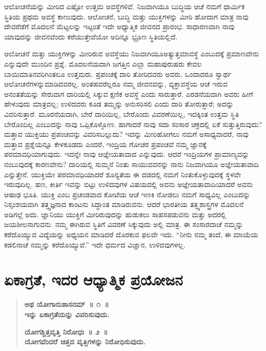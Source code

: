 \vskip 0.3cm

ಆಲೋಚನೆಯನ್ನು ಮೀರಿದ ಎಷ್ಟೋ ಉತ್ತಮ ಅವಸ್ಥೆಗಳಿವೆ. ನಿಜವಾಗಿಯೂ ಬುದ್ಧಿಯ ಆಚೆ ನಮಗೆ ಧಾರ್ಮಿಕ ಸ್ಥಿತಿಯ ಪ್ರಥಮ ಅವಸ್ಥೆ ಕಾಣುವುದು. ಆಲೋಚನೆ, ಬುದ್ಧಿ ಮತ್ತು ಯುಕ್ತಿಗಳನ್ನು ಮೀರಿ ಹೋದಾಗ ಮಾತ್ರ ನಾವು ದೇವರೆಡೆಗೆ ಮೊದಲನೆ ಮೆಟ್ಟಲನ್ನು ಇಟ್ಟಂತೆ ಇದೇ ಅಧ್ಯಾತ್ಮಿಕ ಜೀವನದ ಪ್ರಾರಂಭ. ಸಾಧಾರಣವಾಗಿ ನಾವು ಯಾವುದನ್ನು ಜೀವನವೆಂದು ಕರೆಯುತ್ತೇವೆಯೋ ಅದಿನ್ನೂ ಭ್ರೂಣ ಸ್ಥಿತಿಯಲ್ಲಿದೆ. 

\vskip 0.3cm

ಆಲೋಚನೆ ಮತ್ತು ಯುಕ್ತಿಗಳನ್ನು ಮೀರಿರುವ ಅವಸ್ಥೆಯು ನಿಜವಾಗಿಯೂ\break ಅತ್ಯುತ್ತಮಾವಸ್ಥೆ ಎಂಬುದಕ್ಕೆ ಪ್ರಮಾಣವೇನು ಎನ್ನುವುದೇ ಮುಂದಿನ ಪ್ರಶ್ನೆ. ಮೊದಲನೆಯದಾಗಿ ಜಗತ್ತಿನ ಎಲ್ಲಾ ಮಹಾಪುರುಷರು ಕೇವಲ ಬಾಯಿಮಾತಿನವರಿಗಿಂತಲೂ ಉತ್ತಮರು. ಪ್ರಪಂಚಕ್ಕೆ ದಾರಿ ತೋರಿದವರು ಅವರು. ಒಂದಾದರೂ ಸ್ವಾರ್ಥ ಆಲೋಚನೆಗಳನ್ನು\break ಮಾಡಿದವರಲ್ಲ. ಅಂತಹವರೆಲ್ಲರೂ ನಮ್ಮ ಜೀವನವನ್ನು, ವ್ಯಕ್ತಾವಸ್ಥೆಯ ಆಚೆ ಇರುವ ಅನಂತತೆಯನ್ನು ಸೇರುವಾಗ ದಾರಿಯಲ್ಲಿ ಸಿಕ್ಕುವ ಕ್ಷಣಿಕ ಅವಸ್ಥೆ ಎಂದು ಸಾರುತ್ತಾರೆ. ಎರಡನೆಯದಾಗಿ ಅವರು ಹೀಗೆ ಹೇಳುವುದು ಮಾತ್ರವಲ್ಲ; ಉಳಿದವರು ಕೂಡ ತಮ್ಮನ್ನು ಅನುಸರಿಸಲಿ ಎಂದು ದಾರಿ ತೋರುತ್ತಾರೆ; ಅದನ್ನು ವಿವರಿಸುತ್ತಾರೆ. ಮೂರನೆಯದಾಗಿ, ಬೇರೆ ದಾರಿಯಿಲ್ಲ, ಬೇರೊಂದು ವಿವರಣೆಯಿಲ್ಲ, ಇದಕ್ಕಿಂತ ಉತ್ತಮ ಸ್ಥಿತಿ ಬೇರೊಂದಿಲ್ಲ ಎಂಬುದನ್ನು ನಾವು ಒಪ್ಪಿಕೊಳ್ಳೋಣ. ಹಾಗಾದರೆ ನಾವು ಸದಾ ಸಂಸಾರ ಚಕ್ರದಲ್ಲಿ ಏಕೆ ಸುತ್ತುತ್ತಿರುವುದು? ಮತ್ತಾವ ಯುಕ್ತಿಯು ಪ್ರಪಂಚವನ್ನು ವಿವರಿಸಬಲ್ಲುದು? ಇದನ್ನು ಮೀರಿಹೋಗಲು ನಮಗೆ ಅಸಾಧ್ಯವಾದರೆ, ನಾವು ಮತ್ತಾವ ಪ್ರಶ್ನೆಯನ್ನೂ ಕೇಳಕೂಡದು ಎಂದರೆ, ಇಂದ್ರಿಯ ಗೋಚರ ಪ್ರಪಂಚವೆ ನಮ್ಮ ಜ್ಞಾನಕ್ಕೆ ಪರಮಾವಧಿಯಾಗುವುದು. ಇದನ್ನೇ ನಾವು ಆಜ್ಞೇಯತಾವಾದ ಎನ್ನುವುದು. ಆದರೆ ಇಂದ್ರಿಯಗಳ ಪ್ರಾಮಾಣ್ಯವನ್ನು ನಂಬುವುದಕ್ಕೆ ಕಾರಣವೇನು? ದಾರಿಯಲ್ಲಿ ಸುಮ್ಮನೆ ನಿಂತು ಸಾಯುವವನನ್ನು ನಾನು ನಿಜವಾಗಿಯೂ ಅಜ್ಞೇಯತಾವಾದಿ ಎನ್ನುತ್ತೇನೆ. ಯುಕ್ತಿಯೇ ಪರಮಾವಧಿಯಾದರೆ ಶೂನ್ಯತೆಯ ಈ ದಡದಲ್ಲಿ ನಮಗೆ ನಿಂತುಕೊಳ್ಳುವುದಕ್ಕೆ ಸ್ಥಳವೇ ಇರುವುದಿಲ್ಲ. ಹಣ, ಕೀರ್ತಿ ಇವನ್ನು ಬಿಟ್ಟು ಉಳಿದವುಗಳ ವಿಷಯದಲ್ಲಿ ಅವನು ಅಜ್ಞೇಯತಾವಾದಿಯಾದರೆ ಅವನು ಆಷಾಢ ಭೂತಿ. ಯುಕ್ತಿ ಎಂಬ ಪ್ರಚಂಡವಾದ ಕೋಟೆಯ ಆಚೆ ಇಣಕಿ ನೋಡಲು ನಮಗೆ ಸಾಧ್ಯವಿಲ್ಲ ಎಂಬುದನ್ನು ನಿಸ್ಸಂಶಯವಾಗಿ ತತ್ತ್ವಜ್ಞನಾದ ಕಾಂಟನು ಸಿದ್ಧಾಂತ ಮಾಡಿರುವನು. ಆದರೆ ಭಾರತೀಯ ತತ್ತ್ವಶಾಸ್ತ್ರಗಳ ಮೊದಲನೆ ಅಡಿಗಲ್ಲೆ ಅದು. ಜ್ಞಾನಿಯು ಯುಕ್ತಿಗೆ ಮೀರಿರುವುದನ್ನು ಹುಡುಕಲು ಸಾಹಸಪಡುವನು ಮತ್ತು ಅದರಲ್ಲಿ ಜಯಶೀಲನಾಗುವನು. ನಮ್ಮ ಈಗಿರುವ ಸ್ಥಿತಿಗೆ ವಿವರಣೆ ಸಿಕ್ಕುವುದು ಅಲ್ಲಿ ಮಾತ್ರ. ಈ ಸಂಸಾರದಾಚೆ ನಮ್ಮನ್ನು ಕರೆದೊಯ್ಯುವ ವಿದ್ಯೆಯನ್ನು ಅಧ್ಯಯನ ಮಾಡಿದರೆ ದೊರಕುವ ಫಲವೇ ಇದು. “ನೀನು ನಮ್ಮ ತಂದೆ, ಈ ಮಾಯೆಯ ಕಡಲಿನಾಚೆ ನಮ್ಮನ್ನು ಕರೆದೊಯ್ಯುವೆ.” ಇದೇ ಧರ್ಮದ ವಿಜ್ಞಾನ, ಉಳಿದವುಗಳಲ್ಲ.

\chapter{ಏಕಾಗ್ರತೆ, ಇದರ ಆಧ್ಯಾತ್ಮಿಕ ಪ್ರಯೋಜನ}%

\vspace{.3cm}

\begin{verse}
\textbf{ಅಥ ಯೋಗಾನುಶಾಸನಮ್​~॥ ೧~॥\\ಇನ್ನು ಏಕಾಗ್ರತೆಯನ್ನು ವಿವರಿಸುವುದು.}

\textbf{ಯೋಗಶ್ಚಿತ್ತವೃತ್ತಿ ನಿರೋಧಃ~॥ ೨~॥\\ಯೋಗವೆಂದರೆ ಚಿತ್ತದ ವೃತ್ತಿಗಳನ್ನು ನಿರೋಧಿಸುವುದು. }
\end{verse}

